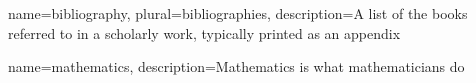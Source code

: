 
{
        name=bibliography,
        plural=bibliographies,
        description={A list of the books referred to in a scholarly work,
typically printed as an appendix}
}

{
    name=mathematics,
    description={Mathematics is what mathematicians do}
}



